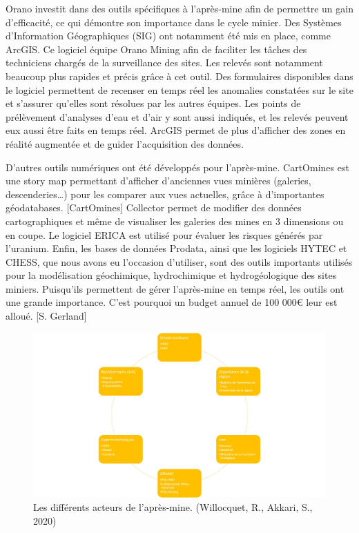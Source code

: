 \documentclass{article}
\begin{document}
Orano investit dans des outils spécifiques à l’après-mine afin de permettre un gain d’efficacité, ce qui démontre son importance dans le cycle minier. Des Systèmes d’Information Géographiques (SIG) ont notamment été mis en place, comme ArcGIS. Ce logiciel équipe Orano Mining afin de faciliter les tâches des techniciens chargés de la surveillance des sites. Les relevés sont notamment beaucoup plus rapides et précis grâce à cet outil. Des formulaires disponibles dans le logiciel permettent de recenser en temps réel les anomalies constatées sur le site et s’assurer qu’elles sont résolues par les autres équipes. Les points de prélèvement d’analyses d’eau et d’air y sont aussi indiqués, et les relevés peuvent eux aussi être faits en temps réel. ArcGIS permet de plus d’afficher des zones en réalité augmentée et de guider l’acquisition des données. 

D’autres outils numériques ont été développés pour l’après-mine. CartOmines est une story map permettant d’afficher d’anciennes vues minières (galeries, descenderies…) pour les comparer aux vues actuelles, grâce à d’importantes géodatabases. [CartOmines] Collector permet de modifier des données cartographiques et même de visualiser les galeries des mines en 3 dimensions ou en coupe. Le logiciel ERICA est utilisé pour évaluer les risques générés par l’uranium. Enfin, les bases de données Prodata, ainsi que les logiciels HYTEC et CHESS, que nous avons eu l’occasion d’utiliser, sont des outils importants utilisés pour la modélisation géochimique, hydrochimique et hydrogéologique des sites miniers. Puisqu’ils permettent de gérer l’après-mine en temps réel, les outils ont une grande importance. C’est pourquoi un budget annuel de 100 000€ leur est alloué. [S. Gerland]


\begin{figure}[H]
    \centering
    \includegraphics[width=0.9\linewidth]{I_B_3.jpg}
    \caption{Les différents acteurs de l'après-mine. (Willocquet, R., Akkari, S., 2020)}
    \label{fig:acteurs_apres_mine}
\end{figure}
\end{document}
